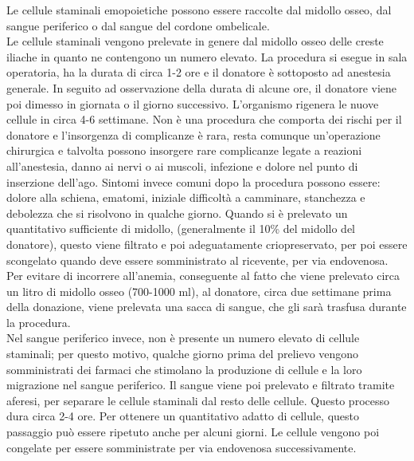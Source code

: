 Le cellule staminali emopoietiche possono essere raccolte dal midollo osseo, dal sangue periferico o dal sangue del 
cordone ombelicale.\\ 
Le cellule staminali vengono prelevate in genere dal midollo osseo delle creste iliache in quanto ne contengono un 
numero elevato. La procedura si esegue in sala operatoria, ha la durata di circa 1-2 ore e il donatore è sottoposto 
ad anestesia generale. In seguito ad osservazione della durata di alcune ore, il donatore viene poi dimesso in giornata
o il giorno successivo. L’organismo rigenera le nuove cellule in circa 4-6 settimane. 
Non è una procedura che comporta dei rischi per il donatore e l’insorgenza di complicanze è rara, resta comunque 
un’operazione chirurgica e talvolta possono insorgere rare complicanze legate a  reazioni all’anestesia, danno ai 
nervi o ai muscoli, infezione e  dolore nel punto di inserzione dell’ago. 
Sintomi invece comuni dopo la procedura possono essere: dolore alla schiena, ematomi, iniziale difficoltà a camminare, 
stanchezza e debolezza che si risolvono in qualche giorno. 
Quando si è prelevato un quantitativo sufficiente di midollo, (generalmente il 10\% del midollo del donatore), 
questo viene filtrato e poi adeguatamente criopreservato, per poi essere scongelato quando deve essere somministrato 
al ricevente, per via endovenosa\cite{STEMCELLS}.\\
Per evitare di incorrere all’anemia, conseguente al fatto che viene prelevato circa un litro di midollo osseo 
(700-1000 ml), al donatore, circa due settimane prima della donazione, viene prelevata una sacca di sangue, 
che gli sarà trasfusa durante la procedura\cite{TRAPIANTO}.\\

Nel sangue periferico invece, non è presente un numero elevato di cellule staminali; per questo motivo, qualche 
giorno prima del prelievo vengono somministrati dei farmaci che stimolano  la produzione di cellule e la loro 
migrazione nel sangue periferico. Il sangue viene poi prelevato e filtrato tramite aferesi, per separare le cellule 
staminali dal resto delle cellule. Questo  processo dura circa 2-4 ore. Per ottenere un quantitativo adatto di cellule,
questo passaggio può essere ripetuto anche per alcuni giorni. 
Le cellule vengono poi congelate per essere somministrate per via endovenosa successivamente\cite{STEMCELLS}.\\

